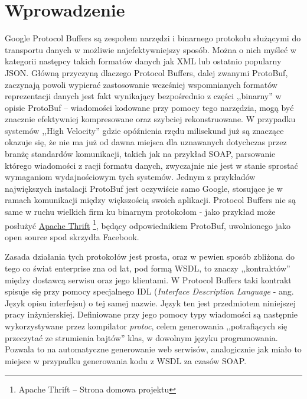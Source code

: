 \documentclass[pdflatex,11pt]{aghdpl}
\author{Konrad Malawski}
\date{2011}
\begin{document}
\titlepages

\tableofcontents
\clearpage

\chapter{Wprowadzenie}
\label{cha:wprowadzenie}

Google Protocol Buffers są zespołem narzędzi i binarnego protokołu służącymi do transportu danych w możliwie najefektywniejszy sposób.
Można o nich myśleć w kategorii następcy takich formatów danych jak XML lub ostatnio popularny JSON. Główną przyczyną dlaczego Protocol Buffers, 
dalej zwanymi ProtoBuf, zaczynają powoli wypierać zastosowanie wcześniej wspomnianych formatów reprezentacji danych jest fakt wynikający bezpośrednio
z części ,,binarny'' w opisie ProtoBuf -- wiadomości kodowane przy pomocy tego narzędzia, mogą być znacznie efektywniej kompresowane oraz szybciej 
rekonstruowane. W przypadku systemów ,,High Velocity'' gdzie opóźnienia rzędu milisekund już są znaczące okazuje się, że nie ma już od dawna miejsca
dla uznawanych dotychczas przez branżę standardów komunikacji, takich jak na przykład SOAP, parsowanie którego wiadomości z racji formatu danych, zwyczajnie
nie jest w stanie sprostać wymaganiom wydajnościowym tych systemów. Jednym z przykładów największych instalacji ProtoBuf jest oczywiście samo Google, 
stosujące je w ramach komunikacji między większością swoich aplikacji. Protocol Buffers nie są same w ruchu wielkich firm ku binarnym protokołom - 
jako przykład może posłużyć \href{http://thrift.apache.org/}{Apache Thrift} \footnote{Apache Thrift -- Strona domowa projektu}, będący odpowiednikiem ProtoBuf,
uwolnionego jako open source spod skrzydła Facebook. 

Zasada działania tych protokołów jest prosta, oraz w pewien sposób zbliżona do tego co świat enterprise zna od lat, pod formą WSDL, to znaczy ,,kontraktów''
między dostawcą serwisu oraz jego klientami. W Protocol Buffers taki kontrakt spisuje się przy pomocy specjalnego IDL (\textit{Interface Description Language} 
- ang. Język opisu interfejsu) o tej samej nazwie. Język ten jest przedmiotem niniejszej pracy inżynierskiej. Definiowane przy jego pomocy typy wiadomości
są następnie wykorzystywane przez kompilator \textit{protoc}, celem generowania ,,potrafiących się przeczytać ze strumienia bajtów'' klas, w dowolnym języku
programowania. Pozwala to na automatyczne generowanie web serwisów, analogicznie jak miało to miejsce w przypadku generowania kodu z WSDL za czasów SOAP.
\end{document}
